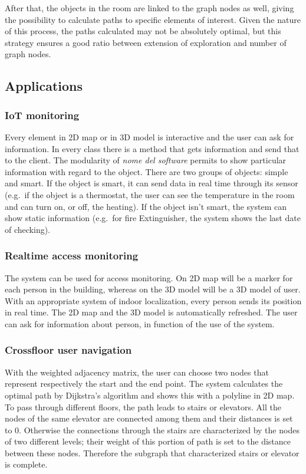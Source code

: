 \documentclass{sig-alternate}
\begin{document}
After that, the objects in the room are linked to the graph nodes as
well, giving the possibility to calculate paths to specific elements of
interest. Given the nature of this process, the paths calculated may not
be absolutely optimal, but this strategy ensures a good ratio between
extension of exploration and number of graph nodes.

\subsection{Applications}\label{applications}

\subsubsection{IoT monitoring}\label{iot-monitoring}

Every element in 2D map or in 3D model is interactive and the user can
ask for information. In every class there is a method that gets
information and send that to the client. The modularity of \emph{nome
del software} permits to show particular information with regard to the
object. There are two groups of objects: simple and smart. If the object
is smart, it can send data in real time through its sensor (e.g.~if the
object is a thermostat, the user can see the temperature in the room and
can turn on, or off, the heating). If the object isn't smart, the system
can show static information (e.g.~for fire Extinguisher, the system
shows the last date of checking).

\subsubsection{Realtime access
monitoring}\label{realtime-access-monitoring}

The system can be used for access monitoring. On 2D map will be a marker
for each person in the building, whereas on the 3D model will be a 3D
model of user. With an appropriate system of indoor localization, every
person sends its position in real time. The 2D map and the 3D model is
automatically refreshed. The user can ask for information about person,
in function of the use of the system.

\subsubsection{Crossfloor user
navigation}\label{crossfloor-user-navigation}

With the weighted adjacency matrix, the user can choose two nodes that
represent respectively the start and the end point. The system
calculates the optimal path by Dijkstra's algorithm and shows this with
a polyline in 2D map. To pass through different floors, the path leads
to stairs or elevators. All the nodes of the same elevator are connected
among them and their distances is set to 0. Otherwise the connections
through the stairs are characterized by the nodes of two different
levels; their weight of this portion of path is set to the distance
between these nodes. Therefore the subgraph that characterized stairs or
elevator is complete.
\end{document}
